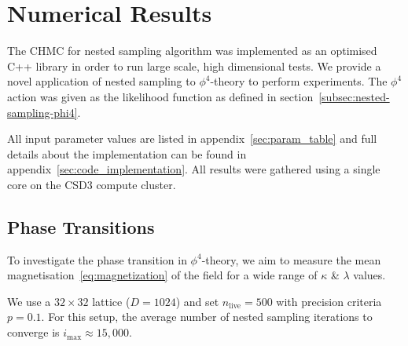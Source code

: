 \documentclass[11pt]{article}
\begin{document}
\section{Numerical Results}\label{sec:numerical_results}
    The CHMC for nested sampling algorithm was implemented as an optimised C++ library in order to run large scale,
    high dimensional tests.
    We provide a novel application of nested sampling to $\phi^4$-theory to perform experiments.
    The $\phi^4$ action was given as the likelihood function as defined in section~\ref{subsec:nested-sampling-phi4}.

    All input parameter values are listed in appendix~\ref{sec:param_table} and full details about the implementation
    can be found in appendix~\ref{sec:code_implementation}.
    All results were gathered using a single core on the CSD3 compute cluster.

\subsection{Phase Transitions}\label{subsec:phase_transition}
    To investigate the phase transition in $\phi^4$-theory, we aim to measure the mean magnetisation~\eqref{eq:magnetization}
    of the field for a wide range of $\kappa$ \& $\lambda$ values.

    We use a $32 \times 32$ lattice ($D=1024$) and set $n_{\text{live}}=500$ with precision criteria $p=0.1$.
    For this setup, the average number of nested sampling iterations to converge is $i_{\max} \approx 15,000$.
\end{document}
